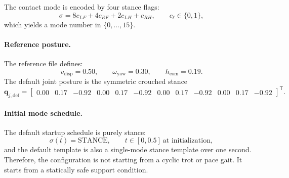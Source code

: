 \documentclass[11pt,a4paper]{article}
\newcommand{\vect}[1]{\boldsymbol{#1}}
\newcommand{\trans}{^{\mathsf T}}
\begin{document}
The contact mode is encoded by four stance flags:
\begin{equation}
\sigma = 8c_{LF} + 4c_{RF} + 2c_{LH} + c_{RH}, \qquad c_{\ell}\in\{0,1\},
\end{equation}
which yields a mode number in $\{0,\ldots,15\}$.

\paragraph{Reference posture.}
The reference file defines:
\begin{equation}
v_{\mathrm{disp}} = 0.50, \qquad
\omega_{\mathrm{yaw}} = 0.30, \qquad
h_{\mathrm{com}} = 0.19.
\end{equation}
The default joint posture is the symmetric crouched stance
\begin{equation}
\vect{q}_{j,\mathrm{def}} =
\begin{bmatrix}
0.00 & 0.17 & -0.92 & 0.00 & 0.17 & -0.92 &
0.00 & 0.17 & -0.92 & 0.00 & 0.17 & -0.92
\end{bmatrix}\trans.
\end{equation}

\paragraph{Initial mode schedule.}
The default startup schedule is purely stance:
\begin{equation}
\sigma(t) = \text{STANCE}, \qquad t \in [0,0.5]\ \text{at initialization},
\end{equation}
and the default template is also a single-mode stance template over one second. Therefore, the configuration is not starting from a
cyclic trot or pace gait. It starts from a statically safe support condition.
\end{document}
